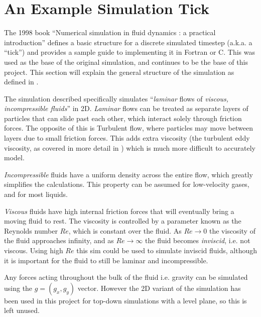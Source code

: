 \newcommand{\deltaT}[0]{$\delta{}t$}
\newcommand{\deltaX}[0]{$\delta{}x$}
\newcommand{\deltaY}[0]{$\delta{}y$}

\section{An Example Simulation Tick}\label{sec:Research:SimulationTick}
The 1998 book ``Numerical simulation in fluid dynamics : a practical introduction''\cite{book:griebel1998numerical} defines a basic structure for a discrete simulated timestep (a.k.a. a ``tick'') and provides a sample guide to implementing it in Fortran or C.
This was used as the base of the original simulation, and continues to be the base of this project.
This section will explain the general structure of the simulation as defined in \cite{book:griebel1998numerical}.

The simulation described specifically simulates ``\emph{laminar} flows of \emph{viscous, incompressible fluids}''\cite{book:griebel1998numerical} in 2D.
\emph{Laminar} flows can be treated as separate layers of particles that can slide past each other, which interact solely through friction forces.
The opposite of this is Turbulent flow, where particles may move between layers due to small friction forces\cite{book:griebel1998numerical}.
This adds extra viscosity (the turbulent eddy viscosity, as covered in more detail in \cite{bird2006transport}) which is much more difficult to accurately model.

\emph{Incompressible} fluids have a uniform density across the entire flow, which greatly simplifies the calculations.
This property can be assumed for low-velocity gases, and for most liquids\cite{book:griebel1998numerical}.

\emph{Viscous} fluids have high internal friction forces that will eventually bring a moving fluid to rest.
The viscosity is controlled by a parameter known as the Reynolds number $Re$\cite{falkovich2018fluid}, which is constant over the fluid.
As $Re \to 0$ the viscosity of the fluid approaches infinity, and as $Re \to \infty$ the fluid becomes \emph{inviscid}, i.e. not viscous.
Using high $Re$ this sim could be used to simulate inviscid fluids, although it is important for the fluid to still be laminar and incompressible.

Any forces acting throughout the bulk of the fluid i.e. gravity can be simulated using the $g = (g_x, g_y)$ vector.
However the 2D variant of the simulation has been used in this project for top-down simulations with a level plane, so this is left unused.

